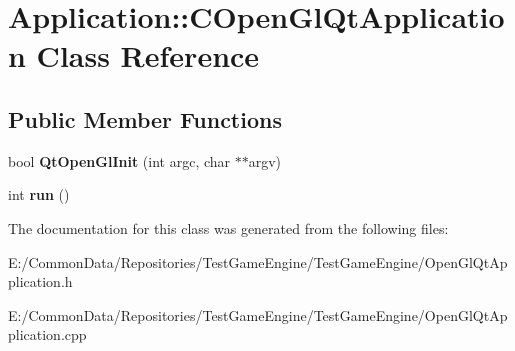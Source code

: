 \hypertarget{class_application_1_1_c_open_gl_qt_application}{}\section{Application\+::C\+Open\+Gl\+Qt\+Application Class Reference}
\label{class_application_1_1_c_open_gl_qt_application}
\subsection*{Public Member Functions}
\begin{DoxyCompactItemize}
\item 
\mbox{\label{class_application_1_1_c_open_gl_qt_application_a6b790c48b3cae62786888c011dce4c37}} 
bool {\bfseries Qt\+Open\+Gl\+Init} (int argc, char $\ast$$\ast$argv)
\item 
\mbox{\label{class_application_1_1_c_open_gl_qt_application_a718f3a5bb8b8f12375f3d4b0487ec784}} 
int {\bfseries run} ()
\end{DoxyCompactItemize}


The documentation for this class was generated from the following files\+:\begin{DoxyCompactItemize}
\item 
E\+:/\+Common\+Data/\+Repositories/\+Test\+Game\+Engine/\+Test\+Game\+Engine/Open\+Gl\+Qt\+Application.\+h\item 
E\+:/\+Common\+Data/\+Repositories/\+Test\+Game\+Engine/\+Test\+Game\+Engine/Open\+Gl\+Qt\+Application.\+cpp\end{DoxyCompactItemize}
